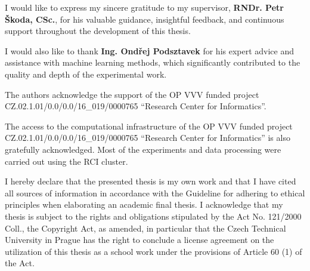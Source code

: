 \documentclass[english,bachelor,oneside]{ctufit-thesis}
\begin{document}
\frontmatter\frontmatterinit

\thispagestyle{empty}\maketitle\thispagestyle{empty}\cleardoublepage



\imprintpage
\stopTOCentries

\begin{acknowledgmentpage}
    I would like to express my sincere gratitude to my supervisor, \textbf{RNDr. Petr Škoda, CSc.}, for his valuable guidance, insightful feedback, and continuous support throughout the development of this thesis.

    I would also like to thank \textbf{Ing. Ondřej Podsztavek} for his expert advice and assistance with machine learning methods, which significantly contributed to the quality and depth of the experimental work.

    The authors acknowledge the support of the OP VVV funded project 
    CZ.02.1.01/0.0/0.0/16\_019/0000765 ``Research Center for Informatics''.

    The access to the computational infrastructure of the OP VVV funded project 
    CZ.02.1.01/0.0/0.0/16\_019/0000765 ``Research Center for Informatics'' is also gratefully acknowledged. Most of the experiments and data processing were carried out using the RCI cluster.
\end{acknowledgmentpage}

\begin{declarationpage}
I hereby declare that the presented thesis is my own work and that I have cited all
sources of information in accordance with the Guideline for adhering to ethical
principles when elaborating an academic final thesis.
I acknowledge that my thesis is subject to the rights and obligations stipulated by the
Act No. 121/2000 Coll., the Copyright Act, as amended, in particular that the Czech
Technical University in Prague has the right to conclude a license agreement on the
utilization of this thesis as a school work under the provisions of Article 60 (1) of the
Act.
\end{declarationpage}

\printabstractpage

\tableofcontents
\listoffigures
\begingroup
\let\clearpage\relax
\listoftables
\thectufitlistingscommand
\endgroup
\end{document}
